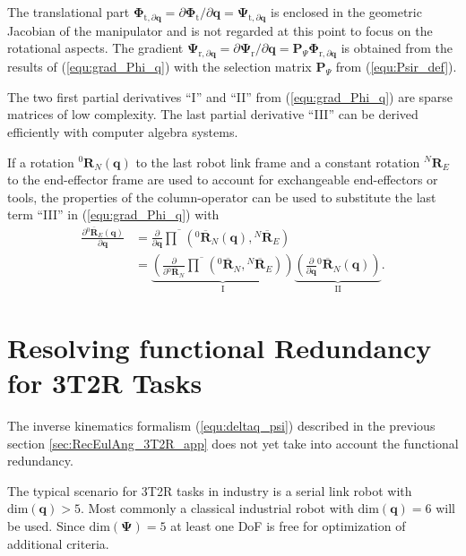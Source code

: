 \documentclass{svproc}
\newcommand{\bm}[1]{\boldsymbol{#1}}
\newcommand{\rotmat}[2]{{{ }^{#1}\boldsymbol{R}}_{#2}}
\newcommand{\rotmato}[2]{{{ }^{#1}\boldsymbol{\overline{R}}}_{#2}}
\begin{document}
The translational part $\bm{\Phi}_{\mathrm{t},\partial\bm{q}}=\partial \bm{\Phi}_{\mathrm{t}} / \partial \bm{q}=\bm{\Psi}_{\mathrm{t},\partial\bm{q}}$ is enclosed in the geometric Jacobian of the manipulator and is not regarded at this point to focus on the rotational aspects.
The gradient 
$\bm{\Psi}_{\mathrm{r}, \partial\bm{q}}=\partial \bm{\Psi}_{\mathrm{r}} / \partial \bm{q}=\bm{P}_{\Psi}\bm{\Phi}_{\mathrm{r},\partial\bm{q}}$
is obtained from the results of (\ref{equ:grad_Phi_q}) with the selection matrix $\bm{P}_{\Psi}$ from (\ref{equ:Psir_def}).

The two first partial derivatives ``I'' and ``II'' from (\ref{equ:grad_Phi_q}) are sparse matrices of low complexity.
The last partial derivative ``III'' can be derived efficiently with computer algebra systems.

If a rotation $\rotmat{0}{N}(\bm{q})$ to the last robot link frame and a constant rotation $\rotmat{N}{E}$ to the end-effector frame are used to account for exchangeable end-effectors or tools, the properties of the column-operator can be used to substitute the last term ``III'' in (\ref{equ:grad_Phi_q}) with
%
\begin{align}
\frac{\partial \rotmato{0}{E}(\bm{q})}{\partial \bm{q}} 
&=
\frac{\partial}{\partial \bm{q}} \overline{\prod}\left( \rotmato{0}{N}(\bm{q}), \rotmato{N}{E}\right) \label{equ:ee_rotation_gradq}\\
&=
\underbrace{\left(\frac{\partial}{\partial \rotmato{0}{N}} \overline{\prod}\left( \rotmato{0}{N}, \rotmato{N}{E}\right)\right)}_{\mathrm{I}}
\underbrace{\left(\frac{\partial}{\partial \bm{q}} \rotmato{0}{N}(\bm{q})\right)}_{\mathrm{II}}. \nonumber
\end{align}

\section{Resolving functional Redundancy for 3T2R Tasks}
\label{sec:ResFuncRed}


The inverse kinematics formalism (\ref{equ:deltaq_psi}) described in the previous section \ref{sec:RecEulAng_3T2R_app} does not yet take into account the functional redundancy.

The typical scenario for 3T2R tasks in industry is a serial link robot with $\mathrm{dim}(\bm{q})>5$.
Most commonly a classical industrial robot with $\mathrm{dim}(\bm{q})=6$ will be used.
Since $\mathrm{dim}(\bm{\Psi})=5$ at least one DoF is free for optimization of additional criteria.
\end{document}
